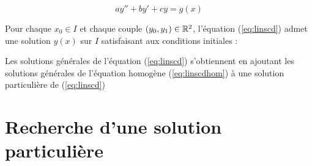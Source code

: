 \begin{frame}

\begin{equation}
ay''+by'+cy=g(x) 
\tag{$E$}
\end{equation}

\pause

\begin{theoreme}
Pour chaque $x_0\in I$ et chaque couple $(y_0,y_1) \in \mathbb{R}^2$,  
l'équation (\ref{eq:linscd}) admet une 
solution $y(x)$ sur $I$ satisfaisant aux conditions initiales : 
\end{theoreme}

\pause

\begin{proposition}
Les solutions générales de l'équation (\ref{eq:linscd}) s'obtiennent en
ajoutant les solutions générales de l'équation homogène (\ref{eq:linscdhom}) 
à une solution particulière de (\ref{eq:linscd})
\end{proposition}

\end{frame}


\section*{Recherche d'une solution particulière}

